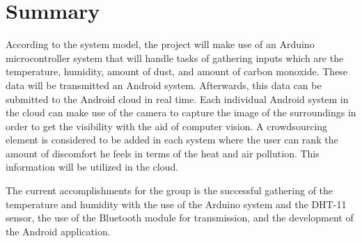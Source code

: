 \section{Summary}

According to the system model, the project will make use of an Arduino microcontroller system that will handle tasks of gathering inputs which are the temperature, humidity, amount of dust, and amount of carbon monoxide. These data will be transmitted an Android system. Afterwards, this data can be submitted  to the Android cloud in real time. Each individual Android system in the cloud can make use of the camera to capture the image of the surroundings in order to get the visibility with the aid of computer vision. A crowdsourcing element is considered to be added in each system where the user can rank the amount of discomfort he feels in terms of the heat and air pollution. This information will be utilized in the cloud.

The current accomplishments for the group is the successful gathering of the temperature and humidity with the use of the Arduino system and the DHT-11 sensor, the use of the Bluetooth module for transmission, and the development of the Android application. 